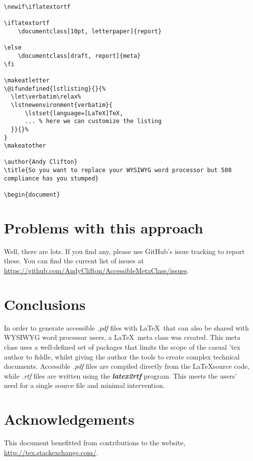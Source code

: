 \documentclass[12pt,letterpaper]{article}
\newcommand{\fn}[1]{\emph{#1}}
\newcommand{\packagename}[1]{\textbf{\emph{#1}}}
\begin{document}
\begin{verbatim}
\newif\iflatextortf

\iflatextortf
    \documentclass[10pt, letterpaper]{report}
    
\else
    \documentclass[draft, report]{meta} 
\fi

\makeatletter
\@ifundefined{lstlisting}{}{%
  \let\verbatim\relax%
  \lstnewenvironment{verbatim}{
      \lstset{language=[LaTeX]TeX,
      ... % here we can customize the listing
  }}{}%
}
\makeatother

\author{Andy Clifton}
\title{So you want to replace your WYSIWYG word processor but 508 compliance has you stumped}
 
\begin{document}

\end{verbatim}

\section{Problems with this approach}
Well, there are lots. If you find any, please use GitHub's issue tracking to report these. You can find the current list of issues at  \url{https://github.com/AndyClifton/AccessibleMetaClass/issues}.

\section{Conclusions}
In order to generate accessible \fn{.pdf} files with \LaTeX\ that can also be shared with WYSIWYG word processor users, a \LaTeX\ meta class was created. This meta class uses a well-defined set of packages that limits the scope of the casual 'tex author to fiddle, whilst giving the author the tools to create complex technical documents. Accessible \fn{.pdf} files are compiled directly from the \LaTeX source code, while \fn{.rtf} files are written using the \packagename{latex2rtf} program. This meets the users' need for a single source file and minimal intervention.

\section*{Acknowledgements}
This document benefitted from contributions to the website, \url{http://tex.stackexchange.com/}.
\end{document}
